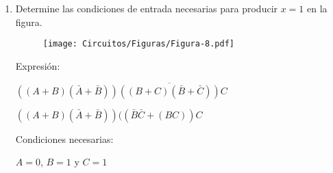 \documentclass[a4paper, 12pt]{article}
\newcommand{\Pspace}{0.5cm}
\newcommand{\Aspace}{0.2cm}
\begin{document}
\begin{enumerate}
        \vspace{\Pspace}
        \item Determine las condiciones de entrada necesarias para producir $x = 1$ en la figura.
        \begin{figure}[!ht]
            \centering
            \texttt{[image: Circuitos/Figuras/Figura-8.pdf]}
        \end{figure}
            \vspace{\Aspace} \par
            { \color{azul} 
                Expresión:
                \par $((A + B)(\bar{A} + \bar{B}))\overline{((B + C)(\bar{B} + \bar{C}))}C$
                \par $((A + B)(\bar{A} + \bar{B}))((\bar{B}\bar{C} + (BC))C$

                \vspace{\Aspace}
                \par Condiciones necesarias:
                \par $A = 0$, $B = 1$ y $C = 1$
            }
    \end{enumerate}
\end{document}
